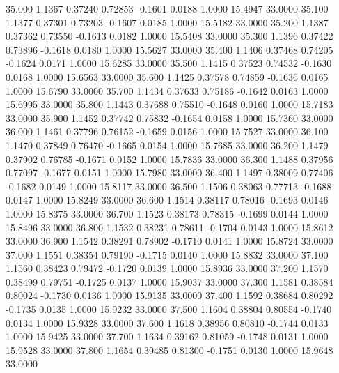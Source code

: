   35.000   1.1367   0.37240   0.72853  -0.1601   0.0188   1.0000  15.4947  33.0000
  35.100   1.1377   0.37301   0.73203  -0.1607   0.0185   1.0000  15.5182  33.0000
  35.200   1.1387   0.37362   0.73550  -0.1613   0.0182   1.0000  15.5408  33.0000
  35.300   1.1396   0.37422   0.73896  -0.1618   0.0180   1.0000  15.5627  33.0000
  35.400   1.1406   0.37468   0.74205  -0.1624   0.0171   1.0000  15.6285  33.0000
  35.500   1.1415   0.37523   0.74532  -0.1630   0.0168   1.0000  15.6563  33.0000
  35.600   1.1425   0.37578   0.74859  -0.1636   0.0165   1.0000  15.6790  33.0000
  35.700   1.1434   0.37633   0.75186  -0.1642   0.0163   1.0000  15.6995  33.0000
  35.800   1.1443   0.37688   0.75510  -0.1648   0.0160   1.0000  15.7183  33.0000
  35.900   1.1452   0.37742   0.75832  -0.1654   0.0158   1.0000  15.7360  33.0000
  36.000   1.1461   0.37796   0.76152  -0.1659   0.0156   1.0000  15.7527  33.0000
  36.100   1.1470   0.37849   0.76470  -0.1665   0.0154   1.0000  15.7685  33.0000
  36.200   1.1479   0.37902   0.76785  -0.1671   0.0152   1.0000  15.7836  33.0000
  36.300   1.1488   0.37956   0.77097  -0.1677   0.0151   1.0000  15.7980  33.0000
  36.400   1.1497   0.38009   0.77406  -0.1682   0.0149   1.0000  15.8117  33.0000
  36.500   1.1506   0.38063   0.77713  -0.1688   0.0147   1.0000  15.8249  33.0000
  36.600   1.1514   0.38117   0.78016  -0.1693   0.0146   1.0000  15.8375  33.0000
  36.700   1.1523   0.38173   0.78315  -0.1699   0.0144   1.0000  15.8496  33.0000
  36.800   1.1532   0.38231   0.78611  -0.1704   0.0143   1.0000  15.8612  33.0000
  36.900   1.1542   0.38291   0.78902  -0.1710   0.0141   1.0000  15.8724  33.0000
  37.000   1.1551   0.38354   0.79190  -0.1715   0.0140   1.0000  15.8832  33.0000
  37.100   1.1560   0.38423   0.79472  -0.1720   0.0139   1.0000  15.8936  33.0000
  37.200   1.1570   0.38499   0.79751  -0.1725   0.0137   1.0000  15.9037  33.0000
  37.300   1.1581   0.38584   0.80024  -0.1730   0.0136   1.0000  15.9135  33.0000
  37.400   1.1592   0.38684   0.80292  -0.1735   0.0135   1.0000  15.9232  33.0000
  37.500   1.1604   0.38804   0.80554  -0.1740   0.0134   1.0000  15.9328  33.0000
  37.600   1.1618   0.38956   0.80810  -0.1744   0.0133   1.0000  15.9425  33.0000
  37.700   1.1634   0.39162   0.81059  -0.1748   0.0131   1.0000  15.9528  33.0000
  37.800   1.1654   0.39485   0.81300  -0.1751   0.0130   1.0000  15.9648  33.0000
